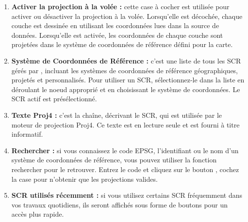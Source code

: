 \begin{enumerate}
\item \textbf{Activer la projection à la volée :}  cette case à cocher est utilisée pour activer ou désactiver la projection à la volée. Lorsqu'elle est décochée, chaque couche est dessinée en utilisant les coordonnées lues dans la source de données. Lorsqu'elle est activée, les coordonnées de chaque couche sont projetées dans le système de coordonnées de référence défini pour la carte.
\item \textbf{Système de Coordonnées de Référence :} c'est une liste de tous les SCR gérés par \qg, incluant les systèmes de coordonnées de référence  géographiques, projetés et personnalisés. Pour utiliser un SCR, sélectionnez-le  dans la liste en déroulant le noeud approprié et en choisissant le système de coordonnées. Le SCR actif est présélectionné.
\item \textbf{Texte Proj4 :} c'est la chaîne, décrivant le SCR, qui est utilisée  par le moteur de projection Proj4. Ce texte est en lecture seule et est fourni  à titre informatif.
\item \textbf{Rechercher :} si vous connaissez le code EPSG, l'identifiant ou le nom d'un système de coordonnées de référence, vous pouvez utiliser la fonction rechercher pour le retrouver. Entrez le code et cliquez sur le bouton , cochez la case  pour n'obtenir que les projections valides.
\item \textbf{SCR utilisés récemment :} si vous utilisez certains SCR fréquemment dans vos travaux quotidiens, ils seront affichés sous forme de  boutons pour un accès plus rapide.
\end{enumerate}

